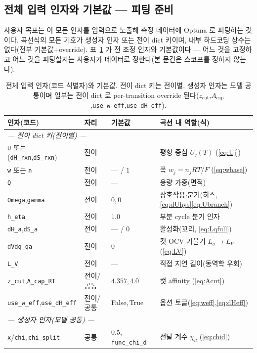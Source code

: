 \documentclass[11pt,a4paper]{article}
\newcommand{\code}[1]{\texttt{#1}}
\begin{document}
\subsection{전체 입력 인자와 기본값 — 피팅 준비}
사용자 목표는 이 모든 인자를 입력으로 노출해 측정 데이터에 Optuna 로 피팅하는 것이다. 곡선식의 모든 기호가 생성자 인자
또는 전이 dict 키이며, 내부 하드코딩 상수는 없다(전부 기본값$+$override). 표~\ref{tab:inputs} 가 전 조정 인자와
기본값이다 — 어느 것을 고정하고 어느 것을 피팅할지는 사용자가 데이터로 정한다(본 문건은 스코프를 정하지 않는다).

\begin{table}[t]
\centering\footnotesize
\renewcommand{\arraystretch}{1.18}
\caption{전체 입력 인자(코드 식별자)와 기본값. 전이 dict 키는 전이별, 생성자 인자는 모델 공통이며 일부는 전이 dict 로
per-transition override 된다($z_\mathrm{cut}$,$A_\mathrm{cap}$,\code{use\_w\_eff},\code{use\_dH\_eff}).}
\label{tab:inputs}
\begin{tabular}{l l l l}
\toprule
인자(코드) & 자리 & 기본값 & 곡선 내 역할(식) \\
\midrule
\multicolumn{4}{l}{\emph{— 전이 dict 키(전이별) —}}\\
\code{U} 또는 (\code{dH\_rxn},\code{dS\_rxn}) & 전이 & --- & 평형 중심 $U_j(T)$ (\eqref{eq:Uj}) \\
\code{w} 또는 \code{n} & 전이 & --- / $1$ & 폭 $w_j=n_jRT/F$ (\eqref{eq:wbase}) \\
\code{Q} & 전이 & --- & 용량 가중(면적) \\
\code{Omega},\code{gamma} & 전이 & $0$,\,$0$ & 상호작용$\cdot$분기(히스, \eqref{eq:dUhys}\eqref{eq:Ubranch}) \\
\code{h\_eta} & 전이 & $1.0$ & 부분 cycle 분기 인자 \\
\code{dH\_a},\code{dS\_a} & 전이 & --- / $0$ & 활성화(꼬리, \eqref{eq:Lqfull}) \\
\code{dVdq\_qa} & 전이 & $0$ & 컷 OCV 기울기 $L_q\!\to\!L_V$ (\eqref{eq:LV}) \\
\code{L\_V} & 전이 & --- & 직접 지연 길이(동역학 우회) \\
\code{z\_cut},\code{A\_cap\_RT} & 전이/공통 & $4.357$,\,$4.0$ & 컷 affinity (\eqref{eq:Acut}) \\
\code{use\_w\_eff},\code{use\_dH\_eff} & 전이/공통 & False,\,True & 옵션 토글(\eqref{eq:weff},\eqref{eq:dHeff}) \\
\multicolumn{4}{l}{\emph{— 생성자 인자(모델 공통) —}}\\
\code{x}/\code{chi},\,\code{chi\_split} & 공통 & $0.5$,\,\code{func\_chi\_d} & 전달 계수 $\chi_d$ (\eqref{eq:chid}) \\

\end{tabular}
\end{table}
\end{document}
